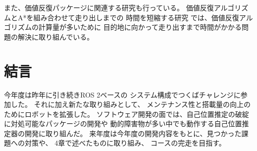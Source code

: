\documentclass[twocolumn,9pt]{jsproceedings}
\begin{document}
また、価値反復パッケージに関連する研究も行っている。
価値反復アルゴリズムとA*を組み合わせて走り出しまでの
時間を短縮する研究\cite{中村2024}
では、価値反復アルゴリズムの計算量が多いために
目的地に向かって走り出すまで時間がかかる問題の解決に取り組んでいる。







\section{結言}
今年度は昨年に引き続きROS 2ベースの
システム構成でつくばチャレンジに参加した。
それに加え新たな取り組みとして、
メンテナンス性と搭載量の向上のためにロボットを拡張した。
ソフトウェア開発の面では、自己位置推定の破綻に対処可能なパッケージの開発や
動的障害物が多い中でも動作する自己位置推定器の開発に取り組んだ。
来年度は今年度の開発内容をもとに、見つかった課題への対策や、
4章で述べたものに取り組み、
コースの完走を目指す。
%
\end{document}
